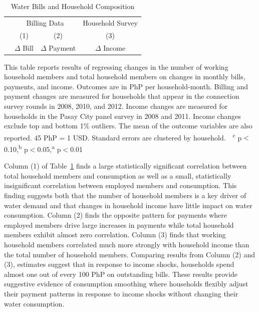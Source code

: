\documentclass[12pt,table]{article}
\begin{document}
\begin{table}[!ht]
\small
\centering
\begin{threeparttable}
\caption{Water Bills and Household Composition}\label{table:panelanalysis}
\vspace{-2mm}
\begin{tabular}{@{}lccc@{}}
\toprule
 & \multicolumn{2}{c}{Billing Data} & Household Survey \\
 & \small (1) & \small (2) & \small (3)  \\
 & \small $\Delta$ Bill & \small $\Delta$ Payment & \small $\Delta$ Income \\[.5em]
 \toprule

\bottomrule
\end{tabular}
\begin{tablenotes}
\footnotesize
\item 
This table reports results of regressing changes in the number of working household members and total household members on changes in monthly bills, payments, and income.  Outcomes are in PhP per household-month.  Billing and payment changes are measured for households that appear in the connection survey rounds in 2008, 2010, and 2012.  Income changes are measured for households in the Pasay City panel survey in 2008 and 2011.  Income changes exclude top and bottom 1\% outliers.  The mean of the outcome variables are also reported. 45 PhP = 1 USD.  Standard errors are clustered by household.  \,\, \textsuperscript{c} p$<$0.10,\textsuperscript{b} p$<$0.05,\textsuperscript{a} p$<$0.01 
\end{tablenotes}
\end{threeparttable}
\end{table}

Column (1) of Table~\ref{table:panelanalysis} finds a large statistically significant correlation between total household members and consumption as well as a small, statistically insignificant correlation between employed members and consumption.  This finding suggests both that the number of household members is a key driver of water demand and that changes in household income have little impact on water consumption.  Column (2) finds the opposite pattern for payments where employed members drive large increases in payments while total household members exhibit almost zero correlation.  Column (3) finds that working household members correlated much more strongly with household income than the total number of household members.  Comparing results from Column (2) and (3), estimates suggest that in response to income shocks, households spend almost one out of every 100 PhP on outstanding bills.  These results provide suggestive evidence of consumption smoothing where households flexibly adjust their payment patterns in response to income shocks without changing their water consumption.  
\end{document}
